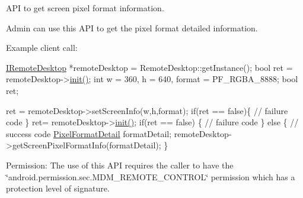 \-A\-P\-I to get screen pixel format information. 

\-Admin can use this \-A\-P\-I to get the pixel format detailed information. 

\-Example client call\-:


\begin{DoxyPre}
  \hyperlink{classandroid_1_1IRemoteDesktop}{IRemoteDesktop} *remoteDesktop = RemoteDesktop::getInstance();
  bool ret = remoteDesktop->\hyperlink{classandroid_1_1IRemoteDesktop_a5792cf8c7fa9eeb8e21f39927d0fed1e}{init()};
  int w = 360, h = 640, format = PF\_RGBA\_8888;
  bool ret;\end{DoxyPre}



\begin{DoxyPre}  ret = remoteDesktop->setScreenInfo(w,h,format);
  if(ret == false)\{
   // failure code
  \}
  ret= remoteDesktop->\hyperlink{classandroid_1_1IRemoteDesktop_a5792cf8c7fa9eeb8e21f39927d0fed1e}{init()};
  if(ret == false)  \{
     // failure code
  \} else \{
     // success code
     \hyperlink{structandroid_1_1PixelFormatDetail}{PixelFormatDetail} formatDetail;
     remoteDesktop->getScreenPixelFormatInfo(formatDetail);
  \}
 \end{DoxyPre}


\begin{DoxyParagraph}{\-Permission\-: }
\-The use of this \-A\-P\-I requires the caller to have the \char`\"{}android.\-permission.\-sec.\-M\-D\-M\-\_\-\-R\-E\-M\-O\-T\-E\-\_\-\-C\-O\-N\-T\-R\-O\-L\char`\"{} permission which has a protection level of signature.
\end{DoxyParagraph}

